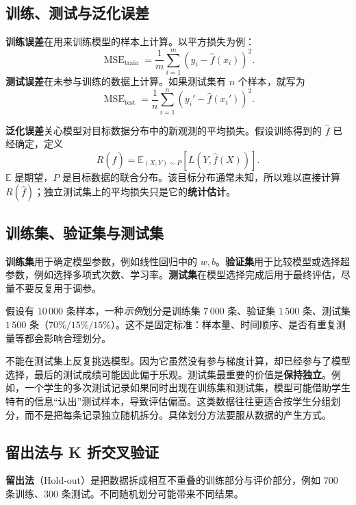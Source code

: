 \subsection{训练、测试与泛化误差}

\textbf{训练误差}在用来训练模型的样本上计算。以平方损失为例：
\begin{equation}\label{eq:train-mse}
\operatorname{MSE}_{\mathrm{train}}
=\frac1m\sum_{i=1}^{m}(y_i-\hat f(x_i))^2.
\end{equation}
\textbf{测试误差}在未参与训练的数据上计算。如果测试集有 $n$ 个样本，就写为
\[
\operatorname{MSE}_{\mathrm{test}}=\frac1n\sum_{i=1}^{n}(y_i'-\hat f(x_i'))^2.
\]

\textbf{泛化误差}关心模型对目标数据分布中的新观测的平均损失。假设训练得到的 $\hat f$ 已经确定，定义
\begin{equation}\label{eq:generalization-risk}
R(\hat f)=\mathbb E_{(X,Y)\sim P}[L(Y,\hat f(X))].
\end{equation}
$\mathbb E$ 是期望，$P$ 是目标数据的联合分布。该目标分布通常未知，所以难以直接计算 $R(\hat f)$；独立测试集上的平均损失只是它的\textbf{统计估计}。

\subsection{训练集、验证集与测试集}

\textbf{训练集}用于确定模型参数，例如线性回归中的 $w,b$。\textbf{验证集}用于比较模型或选择超参数，例如选择多项式次数、学习率。\textbf{测试集}在模型选择完成后用于最终评估，尽量不要反复用于调参。

假设有 $10\,000$ 条样本，一种\emph{示例}划分是训练集 $7\,000$ 条、验证集 $1\,500$ 条、测试集 $1\,500$ 条（$70\%/15\%/15\%$）。这不是固定标准：样本量、时间顺序、是否有重复测量等都会影响合理划分。

不能在测试集上反复挑选模型。因为它虽然没有参与梯度计算，却已经参与了模型选择，最后的测试成绩可能因此偏于乐观。测试集最重要的价值是\textbf{保持独立}。例如，一个学生的多次测试记录如果同时出现在训练集和测试集，模型可能借助学生特有的信息“认出”测试样本，导致评估偏高。这类数据往往更适合按学生分组划分，而不是把每条记录独立随机拆分。具体划分方法要服从数据的产生方式。

\subsection{留出法与 K 折交叉验证}

\textbf{留出法}（Hold-out）是把数据拆成相互不重叠的训练部分与评价部分，例如 $700$ 条训练、$300$ 条测试。不同随机划分可能带来不同结果。

